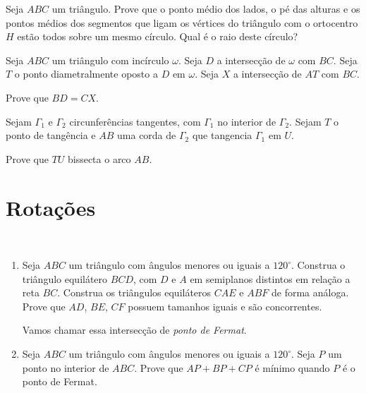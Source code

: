 \documentclass[10pt, a4paper]{article}
\begin{document}
	\begin{prob}
		Seja $ABC$ um triângulo. Prove que o ponto médio dos lados, o pé das alturas e os pontos médios dos segmentos que ligam os vértices do triângulo com o ortocentro $H$ estão todos sobre um mesmo círculo. Qual é o raio deste círculo?
	\end{prob}

	\begin{prob}
		Seja $ABC$ um triângulo com incírculo $\omega$. Seja $D$ a intersecção de $\omega$ com $BC$. Seja $T$ o ponto diametralmente oposto a $D$ em $\omega$. Seja $X$ a intersecção de $AT$ com $BC$.
		
		Prove que $BD = CX$.
	\end{prob}

	\begin{prob}
		Sejam $\Gamma_1$ e $\Gamma_2$ circunferências tangentes, com $\Gamma_1$ no interior de $\Gamma_2$. Sejam $T$ o ponto de tangência e $AB$ uma corda de $\Gamma_2$ que tangencia $\Gamma_1$ em $U$.
		
		Prove que $TU$ bissecta o arco $AB$.
	\end{prob}




	

	





	\section{Rotações}
	
	\begin{prob}\ 
		\begin{enumerate}[label = (\alph*), before = \leavevmode, after = \vspace{-\baselineskip}]
			\item Seja $ABC$ um triângulo com ângulos menores ou iguais a $120^\circ$. Construa o triângulo equilátero $BCD$, com $D$ e $A$ em semiplanos distintos em relação a reta $BC$. Construa os triângulos equiláteros $CAE$ e $ABF$ de forma análoga. Prove que $AD$, $BE$, $CF$ possuem tamanhos iguais e são concorrentes.
			
				Vamos chamar essa intersecção de \emph{ponto de Fermat}.
			\item Seja $ABC$ um triângulo com ângulos menores ou iguais a $120^\circ$. Seja $P$ um ponto no interior de $ABC$. Prove que $AP + BP + CP$ é mínimo quando $P$ é o ponto de Fermat.
		\end{enumerate}%
	\end{prob}%
\end{document}
